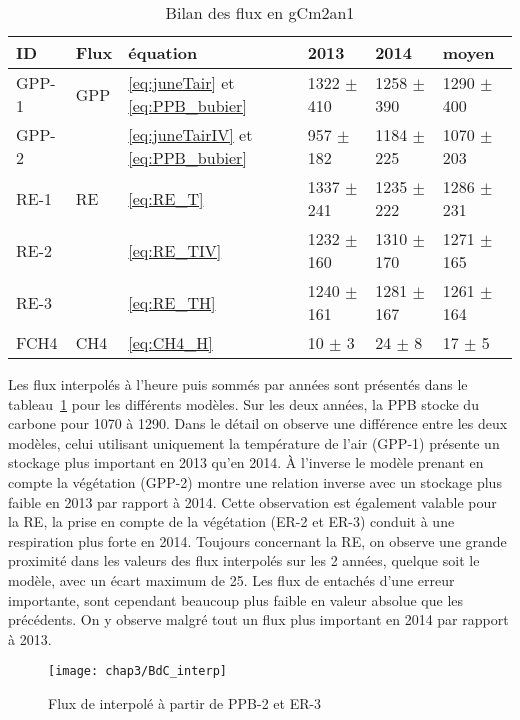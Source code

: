 \begin{table}
\centering
\caption{Bilan des flux en gCm2an1}
\label{table:flux}
\begin{tabular}{llllll}\toprule
ID & Flux & équation & 2013 & 2014 & moyen \\ \midrule
GPP-1 & GPP & \ref{eq:juneTair} et \ref{eq:PPB_bubier} & 1322 $\pm$ 410 & 1258 $\pm$ 390 & 1290 $\pm$ 400 \\
GPP-2 & & \ref{eq:juneTairIV} et \ref{eq:PPB_bubier} & 957 $\pm$ 182 & 1184 $\pm$ 225 & 1070 $\pm$ 203 \\[+1.5ex]
RE-1 & RE & \ref{eq:RE_T} & 1337 $\pm$ 241 & 1235 $\pm$ 222 & 1286 $\pm$ 231 \\
RE-2 & & \ref{eq:RE_TIV} & 1232 $\pm$ 160 & 1310 $\pm$ 170 & 1271 $\pm$ 165\\
RE-3 & & \ref{eq:RE_TH} & 1240 $\pm$ 161 & 1281 $\pm$ 167 & 1261 $\pm$ 164 \\[+1.5ex]
FCH4 & CH4 & \ref{eq:CH4_H} & 10 $\pm$ 3 & 24 $\pm$ 8 & 17 $\pm$ 5 \\
\bottomrule
\end{tabular}
\end{table}

Les flux interpolés à l'heure puis sommés par années sont présentés dans le tableau~\ref{table:flux} pour les différents modèles.
Sur les deux années, la PPB stocke du carbone pour 1070 à \SI{1290}{\gcma}.
Dans le détail on observe une différence entre les deux modèles, celui utilisant uniquement la température de l'air (GPP-1) présente un stockage plus important en 2013 qu'en 2014.
À l'inverse le modèle prenant en compte la végétation (GPP-2) montre une relation inverse avec un stockage plus faible en 2013 par rapport à 2014.
Cette observation est également valable  pour la RE, la prise en compte de la végétation (ER-2 et ER-3) conduit à une respiration plus forte en 2014.
Toujours concernant la RE, on observe une grande proximité dans les valeurs des flux interpolés sur les 2 années, quelque soit le modèle, avec un écart maximum de \SI{25}{\gcma}.
Les flux de \chh entachés d'une erreur importante, sont cependant beaucoup plus faible en valeur absolue que les précédents.
On y observe malgré tout un flux plus important en 2014 par rapport à 2013.

\begin{figure}
\centering
\texttt{[image: chap3/BdC\_interp]}
\caption{Flux de \coo interpolé à partir de PPB-2 et ER-3}
\label{fig:BdC_interp}
\end{figure}

